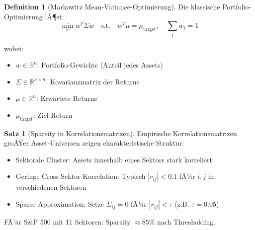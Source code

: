 ﻿\documentclass[a4paper,12pt]{report}
\theoremstyle{definition}
\newtheorem{definition}{Definition}
\newtheorem{satz}{Satz}
\begin{document}
	\begin{definition}[Markowitz Mean-Variance-Optimierung]
		Die klassische Portfolio-Opti\-mierung lÃ¶st:
		\[
		\min_{w} w^T \Sigma w \quad \text{s.t.} \quad w^T \mu = \mu_{\text{target}}, \quad \sum_i w_i = 1
		\]
		
		wobei:
		\begin{itemize}
			\item $w \in \mathbb{R}^n$: Portfolio-Gewichte (Anteil jedes Assets)
			\item $\Sigma \in \mathbb{R}^{n \times n}$: Kovarianzmatrix der Returns
			\item $\mu \in \mathbb{R}^n$: Erwartete Returns
			\item $\mu_{\text{target}}$: Ziel-Return
		\end{itemize}
	\end{definition}
	
	\begin{satz}[Sparsity in Korrelationsmatrizen]
		Empirische Korrelationsmatrizen groÃŸer Asset-Universen zeigen charakteristische Struktur:
		\begin{itemize}
			\item Sektorale Cluster: Assets innerhalb eines Sektors stark korreliert
			\item Geringe Cross-Sektor-Korrelation: Typisch $|r_{ij}| < 0.1$ fÃ¼r $i, j$ in verschiedenen Sektoren
			\item Sparse Approximation: Setze $\Sigma_{ij} = 0$ fÃ¼r $|r_{ij}| < \tau$ (z.B. $\tau = 0.05$)
		\end{itemize}
		
		FÃ¼r S\&P 500 mit 11 Sektoren: Sparsity $\approx 85\%$ nach Thresholding.
	\end{satz}
	
\end{document}
